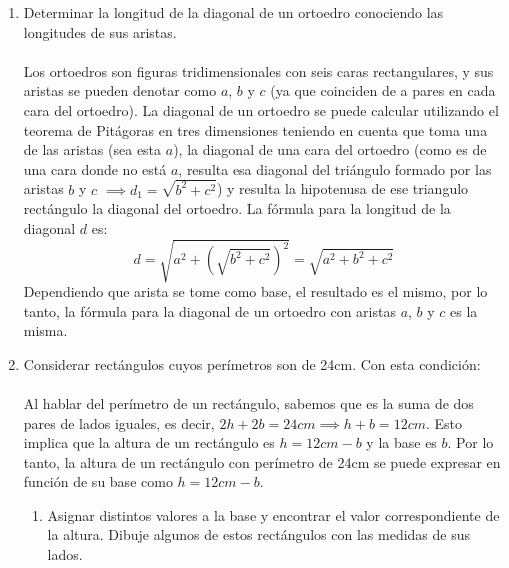 \documentclass[a4paper]{article}
\begin{document}
\begin{enumerate}
\begin{enumerate}
\begin{gather*}
                19=12\cdot k + r\\
                19/12=1+7 \implies k=1 \text{ y } r=7
            \end{gather*}
            Esto quiere decir que hablamos de la tabla del 12, es decir, hay 12 columnas que corresponden a los 12 restos posibles (de 0 a 11) y las filas corresponden al múltiplo de 12:
            \begin{equation*}
                1147=12\cdot 95 + 7
            \end{equation*}
            Por lo tanto, el número 1147 se encuentra en la fila 96 y columna 8.
        \end{enumerate}
    \item Determinar la longitud de la diagonal de un ortoedro conociendo las longitudes de sus aristas.\\\\
    Los ortoedros son figuras tridimensionales con seis caras rectangulares, y sus aristas se pueden denotar como $a$, $b$ y $c$ (ya que coinciden de a pares en cada cara del ortoedro). La diagonal de un ortoedro se puede calcular utilizando el teorema de Pitágoras en tres dimensiones teniendo en cuenta que toma una de las aristas (sea esta $a$), la diagonal de una cara del ortoedro (como es de una cara donde no está $a$, resulta esa diagonal del triángulo formado por las aristas $b$ y $c$ $\implies d_1=\sqrt{b^2 +c^2}$) y resulta la hipotenusa de ese triangulo rectángulo la diagonal del ortoedro. La fórmula para la longitud de la diagonal $d$ es:
        \begin{equation*}
            d= \sqrt{a^2 + \left(\sqrt{b^2+c^2}\right)^2} = \sqrt{a^2 + b^2 + c^2}
        \end{equation*}
    Dependiendo que arista se tome como base, el resultado es el mismo, por lo tanto, la fórmula para la diagonal de un ortoedro con aristas $a$, $b$ y $c$ es la misma.
    \item Considerar rectángulos cuyos perímetros son de 24cm. Con esta condición:\\\\
    Al hablar del perímetro de un rectángulo, sabemos que es la suma de dos pares de lados iguales, es decir, $2h+2b=24cm \implies h+b=12cm$. Esto implica que la altura de un rectángulo es $h=12cm - b$ y la base es $b$. Por lo tanto, la altura de un rectángulo con perímetro de 24cm se puede expresar en función de su base como $h=12cm - b$. 
    \begin{enumerate}
        \item Asignar distintos valores a la base y encontrar el valor correspondiente de la altura. Dibuje algunos de estos rectángulos con las medidas de sus lados.

\end{enumerate}
\end{enumerate}
\end{document}
